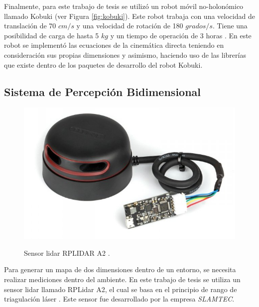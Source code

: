 Finalmente, para este trabajo de tesis se utilizó un robot móvil no-holonómico llamado Kobuki 
(ver Figura \ref{fig:kobuki}). Este robot trabaja con una velocidad de translación de 70 $cm/s$ y 
una velocidad de rotación de 180 $grados/s$. Tiene una posibilidad de carga de hasta 5 $kg$ y un 
tiempo de operación de 3 horas \cite{aboutKobuki}. En este robot se implementó las ecuaciones 
de la cinemática directa teniendo en consideración sus propias dimensiones y asimismo, haciendo
uso de las librerías que existe dentro de los paquetes de desarrollo del robot Kobuki.


\subsection{Sistema de Percepción Bidimensional}
\begin{figure}%
	\centering \footnotesize
 	{\includegraphics[width=0.60\linewidth]{images/rplidar.JPG}}
 	\captionsetup{font=footnotesize}
 	\caption{Sensor lidar RPLIDAR A2 \cite{sensorLidar}.}
 	\label{f:lidar}
\end{figure}

Para generar un mapa de dos dimensiones dentro de un entorno, se necesita realizar 
mediciones dentro del ambiente. En este trabajo de tesis se utiliza un sensor lidar
llamado RPLidar A2, el cual se basa en el principio de rango de triagulación láser
\cite{amann2001laser}. Este sensor fue desarrollado por la empresa \textit{SLAMTEC}.

